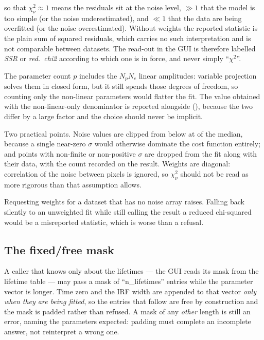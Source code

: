 so that $\chi^{2}_{\nu} \approx 1$ means the residuals sit at the noise level,
$\gg 1$ that the model is too simple (or the noise underestimated), and
$\ll 1$ that the data are being overfitted (or the noise overestimated).
Without weights the reported statistic is the plain sum of squared residuals,
which carries no such interpretation and is not comparable between datasets.
The read-out in the GUI is therefore labelled \emph{SSR} or \emph{red.\
chi2} according to which one is in force, and never simply ``$\chi^2$''.

The parameter count $p$ includes the $N_p N_c$ linear amplitudes: variable
projection solves them in closed form, but it still spends those degrees of
freedom, so counting only the non-linear parameters would flatter the fit. The
value obtained with the non-linear-only denominator is reported alongside
(\code{FitStatistic.value\_nonlinear\_dof}), because the two differ by a large
factor and the choice should never be implicit.

Two practical points. Noise values are clipped from below at
 of the median, because a single near-zero
$\sigma$ would otherwise dominate the cost function entirely; and points with
non-finite or non-positive $\sigma$ are dropped from the fit along with their
data, with the count recorded on the result. Weights are diagonal: correlation
of the noise between pixels is ignored, so $\chi^{2}_{\nu}$ should not be read
as more rigorous than that assumption allows.

Requesting weights for a dataset that has no noise array raises. Falling back
silently to an unweighted fit while still calling the result a reduced
chi-squared would be a misreported statistic, which is worse than a refusal.

\subsection{The fixed/free mask}

A caller that knows only about the lifetimes --- the GUI reads its mask from the
lifetime table --- may pass a mask of ``n\_lifetimes'' entries while the
parameter vector is longer. Time zero and the IRF width are appended to that
vector \emph{only when they are being fitted}, so the entries that follow are
free by construction and the mask is padded rather than refused. A mask of any
\emph{other} length is still an error, naming the parameters expected: padding
must complete an incomplete answer, not reinterpret a wrong one.

